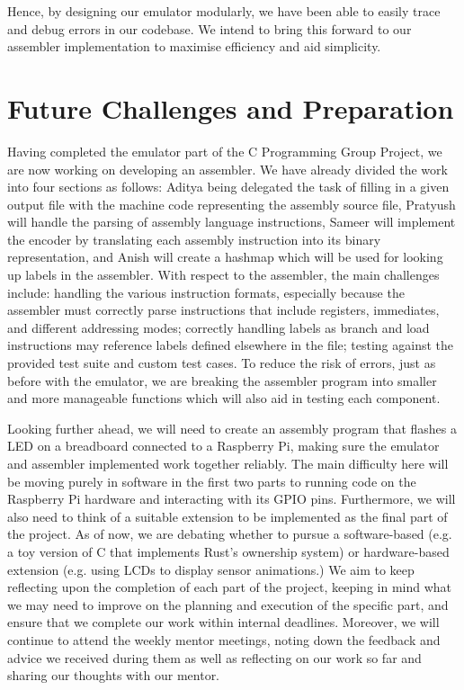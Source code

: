 \documentclass{article}
\begin{document}
Hence, by designing our emulator modularly, we have been able to easily trace and debug errors in our codebase. We intend to bring this forward to our assembler implementation to maximise efficiency and aid simplicity.


\section{Future Challenges and Preparation}

Having completed the emulator part of the C Programming Group Project, we are now working on developing an assembler. We have already divided the work into four sections as follows: Aditya being delegated the task of filling in a given output file with the machine code representing the assembly source file, Pratyush will handle the parsing of assembly language instructions, Sameer will implement the encoder by translating each assembly instruction into its binary representation, and Anish will create a hashmap which will be used for looking up labels in the assembler. With respect to the assembler, the main challenges include: handling the various instruction formats, especially because the assembler must correctly parse instructions that include registers, immediates, and different addressing modes; correctly handling labels as branch and load instructions may reference labels defined elsewhere in the file; testing against the provided test suite and custom test cases. To reduce the risk of errors, just as before with the emulator, we are breaking the assembler program into smaller and more manageable functions which will also aid in testing each component.

Looking further ahead, we will need to create an assembly program that flashes a LED on a breadboard connected to a Raspberry Pi, making sure the emulator and assembler implemented work together reliably. The main difficulty here will be moving purely in software in the first two parts to running code on the Raspberry Pi hardware and interacting with its GPIO pins. Furthermore, we will also need to think of a suitable extension to be implemented as the final part of the project. As of now, we are debating whether to pursue a software-based (e.g. a toy version of C that implements Rust's ownership system) or hardware-based extension (e.g. using LCDs to display sensor animations.) We aim to keep reflecting upon the completion of each part of the project, keeping in mind what we may need to improve on the planning and execution of the specific part, and ensure that we complete our work within internal deadlines. Moreover, we will continue to attend the weekly mentor meetings, noting down the feedback and advice we received during them as well as reflecting on our work so far and sharing our thoughts with our mentor. 
\end{document}
